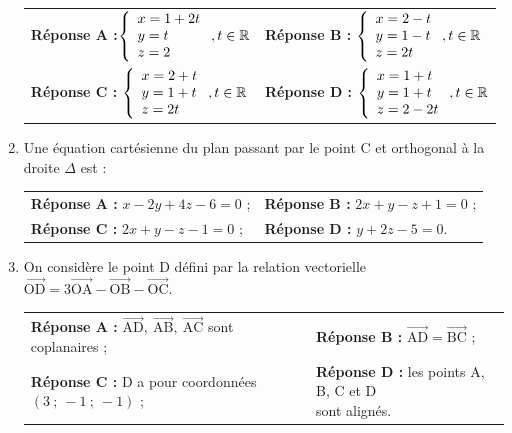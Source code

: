 \documentclass[10pt]{article}
\providecommand{\R}{\mathbb{R}}
\providecommand{\vect}[1]{\overrightarrow{#1}}
\begin{document}
\begin{enumerate}
\begin{center}
\begin{tabularx}{\linewidth}{X X}
\textbf{Réponse A :}$\left\{\begin{array}{l c l}x=1+2t\\y = t\\z = 2\end{array}\right., t \in \R$&
\textbf{Réponse B :} $\left\{\begin{array}{l c l}x =2 - t\\y = 1 - t\\z = 2t\end{array}\right., t \in \R$\\
\textbf{Réponse C :} $\left\{\begin{array}{l c l}x = 2 + t\\y = 1 + t\\z = 2t\end{array}\right., t \in \R$&
\textbf{Réponse D :} $\left\{\begin{array}{l c l}x = 1 + t\\y = 1 + t\\z = 2 - 2t\end{array}\right., t \in \R$
\end{tabularx}
\end{center}


\item Une équation cartésienne du plan passant par le point C et orthogonal à la droite $\Delta$ est :

\begin{center}
\begin{tabularx}{\linewidth}{X X}
\textbf{Réponse A :} $x - 2y + 4z - 6 = 0$ ;& \textbf{Réponse B :} $2x + y - z + 1 = 0$ ;\\
\textbf{Réponse C :} $2x + y - z- 1 = 0$ ;& \textbf{Réponse D :} $y + 2z - 5 = 0$.
\end{tabularx}
\end{center}


\item On considère le point D défini par la relation vectorielle $\vect{\text{OD}} = 3\vect{\text{OA}} - \vect{\text{OB}} - \vect{\text{OC}}$.

\begin{center}
\begin{tabularx}{\linewidth}{X X}
\textbf{Réponse A :} \parbox[t]{4cm}{$\vect{\text{AD}},~ \vect{\text{AB}},~ \vect{\text{AC}}$ sont\\ coplanaires ;} &\textbf{Réponse B :} $\vect{\text{AD}} = \vect{\text{BC}}$ ;\\
\textbf{Réponse C :} \parbox[t]{4cm}{D a pour coordonnées\\ $(3~;~-1~;~-1)$ ;} &\textbf{Réponse D :} \parbox[t]{4cm}{les points A, B, C et D\\ sont alignés.}
\end{tabularx}
\end{center}

\end{enumerate}

\bigskip
\end{document}
